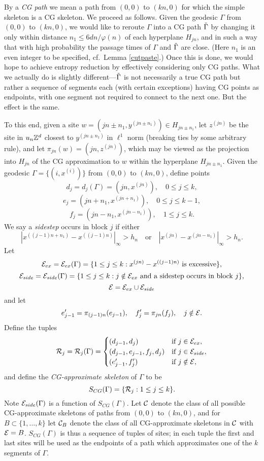 \documentclass[12pt]{amsart}
\theoremstyle{plain}
\theoremstyle{definition}
\numberwithin{equation}{section}
\begin{document}
By a \emph{CG path} we mean a path from $(0,0)$ to $(kn,0)$ for which the simple skeleton is a CG skeleton.  We proceed as follows.  Given the geodesic $\Gamma$ from $(0,0)$ to $(kn,0)$, we would like to reroute $\Gamma$ into a CG path $\tilde{\Gamma}$ by changing it only within distance $n_1 \leq 6dn/\varphi(n)$ of each hyperplane $H_{jn}$, and in such a way that with high probability the passage times of $\Gamma$ and $\tilde{\Gamma}$ are close.  (Here $n_1$ is an even integer to be specified, cf.~Lemma \ref{cutpaste}.)  Once this is done, we would hope to achieve entropy reduction by effectively considering only CG paths.  What we actually do is slightly different---$\tilde{\Gamma}$ is not necessarily a true CG path but rather a sequence of segments each (with certain exceptions) having CG points as endpoints,
with one segment not required to connect to the next one.  But the effect is the same.

To this end, given a site $w=(jn\pm n_1,y^{(jn\pm n_1)}) \in H_{jn\pm n_1}$, let $z^{(jn)}$ be the site in $u_n\mathbb{Z}^d$ closest to $y^{(jn\pm n_1)}$ in $\ell^1$ norm (breaking ties by some arbitrary rule), and let $\pi_{jn}(w) = (jn,z^{(jn)})$, which may be viewed as the projection into $H_{jn}$ of the CG approximation to $w$ within the hyperplane $H_{jn\pm n_1}$.  Given the geodesic $\Gamma=\{(i,x^{(i)})\}$ from $(0,0)$ to $(kn,0)$, define points
\[
  d_j = d_j(\Gamma) = (jn,x^{(jn)}), \quad 0 \leq j \leq k,
  \]
\[
  e_j = (jn+n_1,x^{(jn+n_1)}), \quad 0 \leq j \leq k-1,
  \]
\[
  f_j = (jn-n_1,x^{(jn-n_1)}), \quad 1 \leq j \leq k.
  \]
We say a \emph{sidestep} occurs in block $j$ if either
\[
  |x^{((j-1)n+n_1)} - x^{((j-1)n)}|_\infty > h_n \quad \text{or} \quad |x^{(jn)} - x^{(jn-n_1)}|_\infty > h_n.
  \]
Let 
\[
  \mathcal{E}_{ex} = \mathcal{E}_{ex}(\Gamma) = \{1 \leq j \leq k:  x^{(jn)} - x^{((j-1)n)} \text{ is excessive}\},
  \]
\[
  \mathcal{E}_{side} = \mathcal{E}_{side}(\Gamma) = \{1 \leq j \leq k:  j \notin \mathcal{E}_{ex} \text{ and a sidestep occurs in block } j\},
  \]
\[
  \mathcal{E} = \mathcal{E}_{ex} \cup \mathcal{E}_{side}
  \]
and let
\[
  e_{j-1}' = \pi_{(j-1)n}(e_{j-1}), \quad  f_j' = \pi_{jn}(f_j), \quad j \notin \mathcal{E}.
  \]
Define the tuples
\[
  \mathcal{R}_j = \mathcal{R}_j(\Gamma) = \begin{cases} (d_{j-1},d_j) &\text{if } j \in \mathcal{E}_{ex},\\ (d_{j-1},e_{j-1},f_j,d_j) &\text{if } j \in \mathcal{E}_{side},\\
    (e_{j-1}',f_j') &\text{if } j \notin \mathcal{E}, \end{cases}
  \]
and define the \emph{CG-approximate skeleton} of $\Gamma$ to be
\[
  S_{CG}(\Gamma) = \{ \mathcal{R}_j: 1 \leq j \leq k\}.
  \]
Note $\mathcal{E}_{side}(\Gamma)$ is a  function of $S_{CG}(\Gamma)$.
Let $\mathcal{C}$ denote the class of all possible CG-approximate skeletons of paths from $(0,0)$ to $(kn,0)$, and for $B \subset \{1,\dots,k\}$ let 
$\mathcal{C}_B$ denote the class of all CG-approximate skeletons in $\mathcal{C}$ with $\mathcal{E}=B$.
$S_{CG}(\Gamma)$ is thus a sequence of tuples of sites; in each tuple the first and last sites will be used as the endpoints of a path which approximates one of the $k$ segments of $\Gamma$.  
\end{document}
